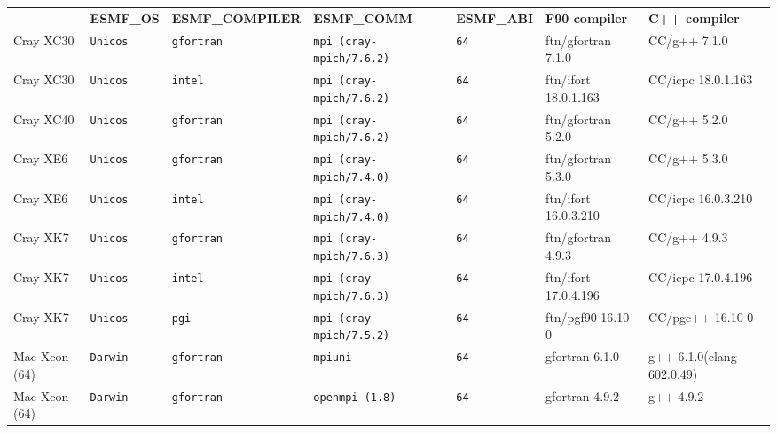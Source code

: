 \begin{longtable}{lllllll}
  &{\bfseries\footnotesize ESMF\_OS} &{\bfseries\footnotesize ESMF\_COMPILER} & {\bfseries\footnotesize ESMF\_COMM} & {\bfseries\footnotesize ESMF\_ABI} &
  {\bfseries\footnotesize F90 compiler} & {\bfseries\footnotesize C++ compiler} \\

Cray XC30             &\tt Unicos &\tt gfortran     &\tt mpi \footnotesize (cray-mpich/7.6.2) &\tt 64     & ftn/gfortran \footnotesize 7.1.0    & CC/g++  \footnotesize 7.1.0       \\
Cray XC30             &\tt Unicos &\tt intel        &\tt mpi \footnotesize (cray-mpich/7.6.2) &\tt 64     & ftn/ifort \footnotesize 18.0.1.163  & CC/icpc \footnotesize 18.0.1.163  \\
Cray XC40             &\tt Unicos &\tt gfortran     &\tt mpi \footnotesize (cray-mpich/7.6.2) &\tt 64     & ftn/gfortran \footnotesize 5.2.0    & CC/g++  \footnotesize 5.2.0       \\
Cray XE6              &\tt Unicos &\tt gfortran     &\tt mpi \footnotesize (cray-mpich/7.4.0) &\tt 64     & ftn/gfortran \footnotesize 5.3.0    & CC/g++  \footnotesize 5.3.0       \\
Cray XE6              &\tt Unicos &\tt intel        &\tt mpi \footnotesize (cray-mpich/7.4.0) &\tt 64     & ftn/ifort \footnotesize 16.0.3.210  & CC/icpc \footnotesize 16.0.3.210  \\
Cray XK7              &\tt Unicos &\tt gfortran     &\tt mpi \footnotesize (cray-mpich/7.6.3) &\tt 64     & ftn/gfortran \footnotesize 4.9.3    & CC/g++  \footnotesize 4.9.3       \\
Cray XK7              &\tt Unicos &\tt intel        &\tt mpi \footnotesize (cray-mpich/7.6.3) &\tt 64     & ftn/ifort \footnotesize 17.0.4.196  & CC/icpc \footnotesize 17.0.4.196  \\
Cray XK7              &\tt Unicos &\tt pgi          &\tt mpi \footnotesize (cray-mpich/7.5.2) &\tt 64     & ftn/pgf90 \footnotesize 16.10-0     & CC/pgc++ \footnotesize 16.10-0    \\
Mac Xeon (64)         &\tt Darwin &\tt gfortran     &\tt mpiuni           &\tt 64           & gfortran \footnotesize 6.1.0        & g++ \footnotesize 6.1.0(clang-602.0.49) \\
Mac Xeon (64)         &\tt Darwin &\tt gfortran     &\tt openmpi (1.8)    &\tt 64           & gfortran \footnotesize 4.9.2        & g++ \footnotesize 4.9.2           \\

\end{longtable}
